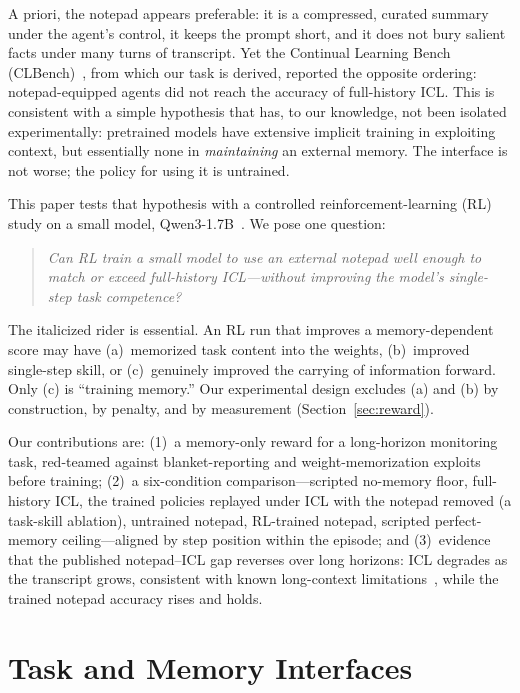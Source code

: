 \documentclass[11pt]{article}
\begin{document}
A priori, the notepad appears preferable: it is a compressed, curated summary under
the agent's control, it keeps the prompt short, and it does not bury salient facts
under many turns of transcript. Yet the Continual Learning Bench
(CLBench)~\cite{clbench}, from
which our task is derived, reported the opposite ordering: notepad-equipped agents
did not reach the accuracy of full-history ICL. This is consistent with a simple
hypothesis that has, to our knowledge, not been isolated experimentally: pretrained
models have extensive implicit training in exploiting context, but essentially none
in \emph{maintaining} an external memory. The interface is not worse; the policy for
using it is untrained.

This paper tests that hypothesis with a controlled reinforcement-learning (RL)
study on a small model, Qwen3-1.7B~\cite{qwen3}. We pose one question:

\begin{quote}
\emph{Can RL train a small model to use an external notepad well enough to match or
exceed full-history ICL---without improving the model's single-step task
competence?}
\end{quote}

The italicized rider is essential. An RL run that improves a memory-dependent score
may have (a)~memorized task content into the weights, (b)~improved single-step
skill, or (c)~genuinely improved the carrying of information forward. Only (c) is
``training memory.'' Our experimental design excludes (a) and (b) by construction,
by penalty, and by measurement (Section~\ref{sec:reward}).

Our contributions are: (1)~a memory-only reward for a long-horizon monitoring task,
red-teamed against blanket-reporting and weight-memorization exploits before
training; (2)~a six-condition comparison---scripted no-memory floor, full-history
ICL, the trained policies replayed under ICL with the notepad removed (a
task-skill ablation), untrained notepad, RL-trained notepad, scripted
perfect-memory ceiling---aligned by step position within the episode; and (3)~evidence that the published notepad--ICL gap reverses
over long horizons: ICL degrades as the transcript grows, consistent with known
long-context limitations~\cite{lostinthemiddle}, while the trained notepad accuracy
rises and holds.

\section{Task and Memory Interfaces}
\label{sec:task}
\end{document}
